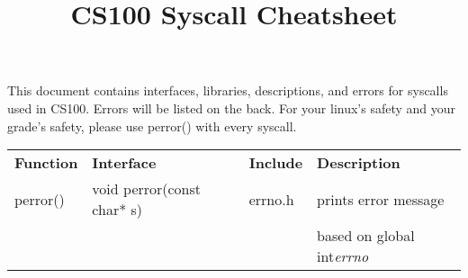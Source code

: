 \documentclass{article}
\title{CS100 Syscall Cheatsheet}
\author{}
\date{}
\begin{document}
\maketitle

\large This document contains interfaces, libraries, descriptions, and errors for 
syscalls used in CS100. Errors will be listed on the back. For your linux's safety and 
your grade's safety, please use perror() with every syscall.

\medskip
\begin{tabular}{llll}
    \bf Function & \bf Interface & \bf Include & \bf Description\\
    perror() & void perror(const char* s) &  errno.h &  prints error message\\
    &&& based on global int\it errno \rm
\end{tabular}
\normalsize
\end{document}
